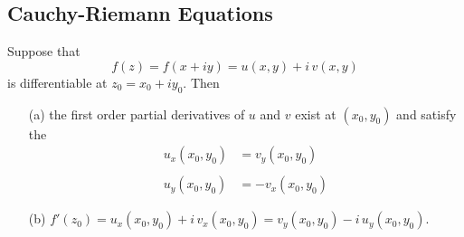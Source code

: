 \subsection{Cauchy-Riemann Equations}
%
%
\medskip
%
\begin{theorem}\label{crequations}
Suppose that 
\[f(z) = f(x + iy) = u(x,y) + i\,v(x,y)\]
is differentiable at $z_0 = x_0 + iy_0$. Then
\begin{itemize}
\item[(a)] the first order partial derivatives of $u$ and $v$ exist at $(x_0,y_0)$ and satisfy the 
\begin{align*}\label{creqex}
u_x(x_0,y_0) &= v_y(x_0,y_0)\\[-0.5em]
\tag{CR}\\[-0.5em]
u_y(x_0,y_0) &= -v_x(x_0,y_0)
\end{align*}
\item[(b)] $f'(z_0) = u_x(x_0,y_0) + i\,v_x(x_0,y_0) = v_y(x_0,y_0) - i\,u_y(x_0,y_0)$.
\end{itemize}
\end{theorem}
